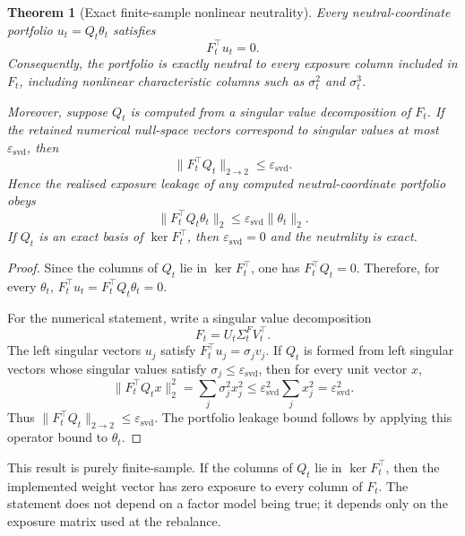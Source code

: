 \documentclass[11pt]{article}
\newtheorem{theorem}{Theorem}
\begin{document}
\begin{theorem}[Exact finite-sample nonlinear neutrality]
\label{thm:exact-neutrality}
Every neutral-coordinate portfolio $u_t=Q_t\theta_t$ satisfies
\begin{equation}
        F_t^\top u_t=0.
\end{equation}
Consequently, the portfolio is exactly neutral to every exposure column included in $F_t$, including
nonlinear characteristic columns such as $\sigma_t^2$ and $\sigma_t^3$.

Moreover, suppose $Q_t$ is computed from a singular value decomposition of $F_t$.  If the retained
numerical null-space vectors correspond to singular values at most $\varepsilon_{\mathrm{svd}}$, then
\begin{equation}
        \|F_t^\top Q_t\|_{2\to2}\le \varepsilon_{\mathrm{svd}}.
\end{equation}
Hence the realised exposure leakage of any computed neutral-coordinate portfolio obeys
\begin{equation}
        \|F_t^\top Q_t\theta_t\|_2 \le \varepsilon_{\mathrm{svd}}\|\theta_t\|_2.
\end{equation}
If $Q_t$ is an exact basis of $\ker F_t^\top$, then $\varepsilon_{\mathrm{svd}}=0$ and the neutrality is exact.
\end{theorem}

\begin{proof}
Since the columns of $Q_t$ lie in $\ker F_t^\top$, one has $F_t^\top Q_t=0$.  Therefore, for every
$\theta_t$, $F_t^\top u_t=F_t^\top Q_t\theta_t=0$.

For the numerical statement, write a singular value decomposition
\[
        F_t=U_t\Sigma_t^F V_t^\top.
\]
The left singular vectors $u_j$ satisfy $F_t^\top u_j=\sigma_j v_j$.  If $Q_t$ is formed from left
singular vectors whose singular values satisfy $\sigma_j\le\varepsilon_{\mathrm{svd}}$, then for every unit
vector $x$,
\[
        \|F_t^\top Q_tx\|_2^2=\sum_j \sigma_j^2 x_j^2
        \le \varepsilon_{\mathrm{svd}}^2\sum_j x_j^2=\varepsilon_{\mathrm{svd}}^2.
\]
Thus $\|F_t^\top Q_t\|_{2\to2}\le\varepsilon_{\mathrm{svd}}$.  The portfolio leakage bound follows by
applying this operator bound to $\theta_t$.
\end{proof}

This result is purely finite-sample. If the columns of $Q_t$ lie in $\ker F_t^\top$, then the
implemented weight vector has zero exposure to every column of $F_t$. The statement does not depend
on a factor model being true; it depends only on the exposure matrix used at the rebalance.
\end{document}
